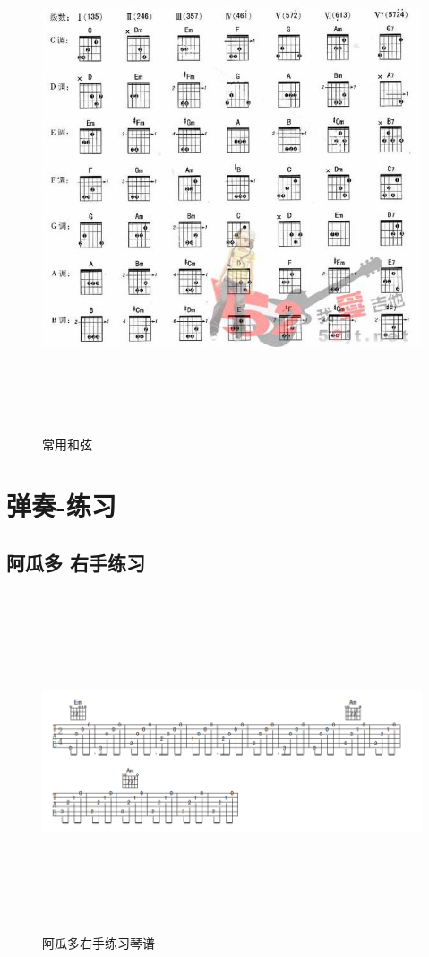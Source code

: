 \documentclass[UTF8,a4paper,12pt]{ctexbook}
\begin{document}
			\begin{figure}[H]
				\centering
				\includegraphics[width=17cm,height=15cm]{hexuan}
				\caption{常用和弦}
			\end{figure}
		
							
\chapter{弹奏-练习}
	\section{阿瓜多 右手练习}
		
		\begin{figure}[H]
			\centering
			\includegraphics[width=17cm,height=10cm]{youshouAGD}
			\caption{阿瓜多右手练习琴谱}
		\end{figure}
		
\end{document}
